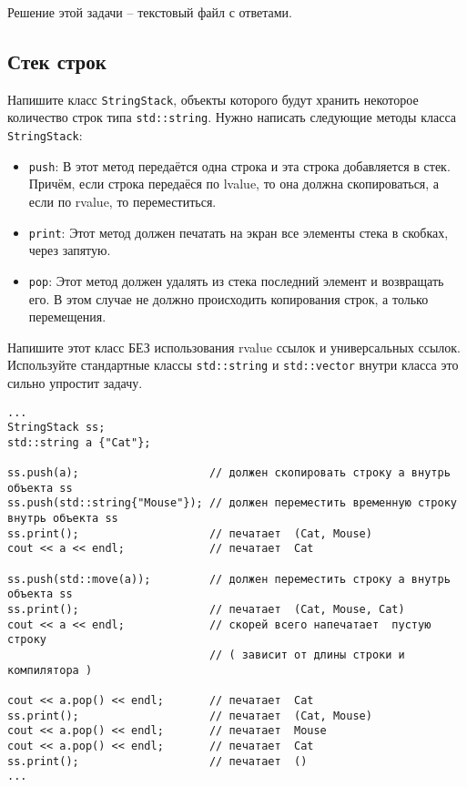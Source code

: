 \documentclass{article}
\begin{document}
Решение этой задачи -- текстовый файл с ответами.

\newpage
\subsection{Стек строк}
Напишите класс \texttt{StringStack}, объекты которого будут хранить некоторое количество строк типа \texttt{std::string}.
Нужно написать следующие методы класса \texttt{StringStack}:

\begin{itemize}
\item \texttt{push}: В этот метод передаётся одна строка и эта строка добавляется в стек. Причём, если строка передаёся по lvalue, то она должна скопироваться, а если по rvalue, то переместиться.
\item \texttt{print}: Этот метод должен печатать на экран все элементы стека в скобках, через запятую.
\item \texttt{pop}: Этот метод должен удалять из стека последний элемент и возвращать его. В этом случае не должно происходить копирования строк, а только перемещения.
\end{itemize}

Напишите этот класс БЕЗ использования rvalue ссылок и универсальных ссылок.
Используйте стандартные классы \texttt{std::string} и \texttt{std::vector} внутри класса это сильно упростит задачу.

\begin{lstlisting}
...
StringStack ss;
std::string a {"Cat"};

ss.push(a);                    // должен скопировать строку a внутрь объекта ss
ss.push(std::string{"Mouse"}); // должен переместить временную строку внутрь объекта ss
ss.print();                    // печатает  (Cat, Mouse)
cout << a << endl;             // печатает  Cat

ss.push(std::move(a));         // должен переместить строку a внутрь объекта ss
ss.print();                    // печатает  (Cat, Mouse, Cat)
cout << a << endl;             // скорей всего напечатает  пустую строку 
                               // ( зависит от длины строки и компилятора )

cout << a.pop() << endl;       // печатает  Cat
ss.print();                    // печатает  (Cat, Mouse)
cout << a.pop() << endl;       // печатает  Mouse
cout << a.pop() << endl;       // печатает  Cat
ss.print();                    // печатает  ()
...
\end{lstlisting}
\end{document}
